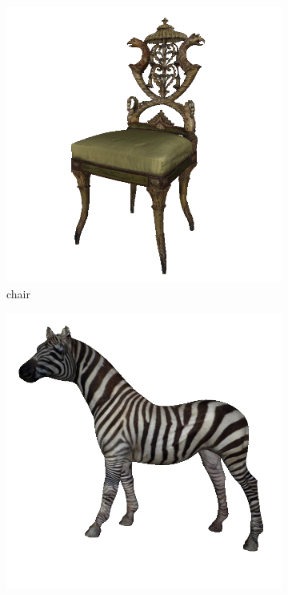 \documentclass[border=15pt, multi, tikz]{article}
\begin{document}
\begin{figure}[!h]
	\begin{subfigure}[b]{0.24\linewidth}
		\includegraphics[width=\linewidth]{./Figures/train-dataset/08.pergolesi-side-chair_texture.png}
		\caption{chair}
	\end{subfigure}
	\begin{subfigure}[b]{0.24\linewidth}
		\includegraphics[width=\linewidth]{./Figures/train-dataset/42.zebra_texture.png}

\end{subfigure}
\end{figure}
\end{document}
